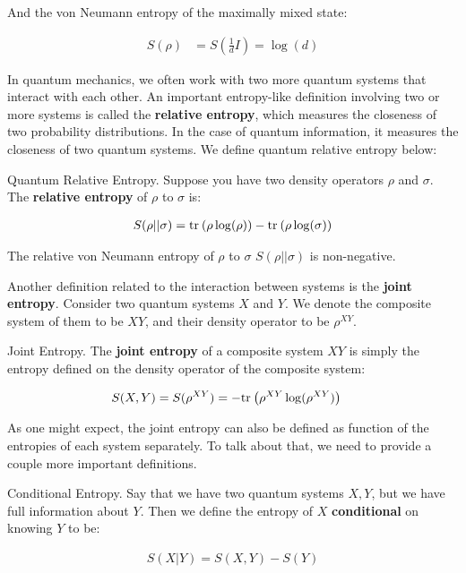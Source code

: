 And the von Neumann entropy of the maximally mixed state:

\begin{align}
    S(\rho) &= S(\tfrac{1}{d}I) = \log(d)
\end{align}

In quantum mechanics, we often work with two more quantum systems that interact with each other. An important entropy-like definition involving two or more systems is called the \textbf{relative entropy}, which measures the closeness of two probability distributions. In the case of quantum information, it measures the closeness of two quantum systems. We define quantum relative entropy below:

\begin{definition}{Quantum Relative Entropy.}
    Suppose you have two density operators $\rho$ and $\sigma$. The \textbf{relative entropy} of $\rho$ to $\sigma$ is:
    
    \begin{align}
        S(\rho||\sigma) = \text{tr}_{}\left( {\rho \log(\rho)} \right) - \text{tr}_{}\left( {\rho \log (\sigma)} \right)
    \end{align}
\end{definition}

\begin{remark}
    The relative von Neumann entropy of $\rho$ to $\sigma$ $S(\rho||\sigma)$ is non-negative.
\end{remark}

Another definition related to the interaction between systems is the \textbf{joint entropy}. Consider two quantum systems $X$ and $Y$. We denote the composite system of them to be $XY$, and their density operator to be $\rho^{XY}$.

\begin{definition}{Joint Entropy.}
    The \textbf{joint entropy} of a composite system $XY$ is simply the entropy defined on the density operator of the composite system:
    
    \begin{align}
        S(X,Y) = S(\rho^{XY}) &= -\text{tr}_{}\left( {\rho^{XY} \log(\rho^{XY})} \right)
    \end{align}
\end{definition}

As one might expect, the joint entropy can also be defined as function of the entropies of each system separately. To talk about that, we need to provide a couple more important definitions.

\begin{definition}{Conditional Entropy.}
    Say that we have two quantum systems $X,Y$, but we have full information about $Y$. Then we define the entropy of $X$ \textbf{conditional} on knowing $Y$ to be: 
    
    \begin{align}
        S(X|Y) = S(X,Y) - S(Y)
    \end{align}
\end{definition}

